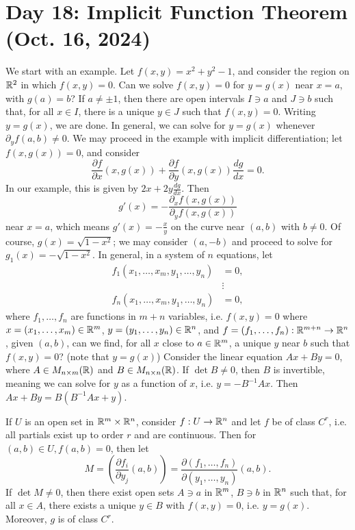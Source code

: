 \section{Day 18: Implicit Function Theorem (Oct. 16, 2024)}
We start with an example. Let $f(x, y) = x^2 + y^2 - 1$, and consider the region on $\mathbb R^2$ in which $f(x, y) = 0$. Can we solve $f(x, y) = 0$ for $y = g(x)$ near $x = a$, with $g(a) = b$? If $a \neq \pm 1$, then there are open intervals $I \ni a$ and $J \ni b$ such that, for all $x \in I$, there is a unique $y \in J$ such that $f(x, y) = 0$. Writing $y = g(x)$, we are done.
\medskip\newline
In general, we can solve for $y = g(x)$ whenever $\partial_y f (a, b) \neq 0$. We may proceed in the example with implicit differentiation; let $f(x, g(x)) = 0$, and consider
\[ \frac{\partial f}{\partial x} (x, g(x)) + \frac{\partial f}{\partial y}(x, g(x)) \frac{dg}{dx} = 0. \]
In our example, this is given by $2x + 2y \frac{dg}{dx}$. Then
\[ g'(x) = -\frac{\partial_x f(x, g(x))}{\partial_y f(x, g(x))} \]
near $x = a$, which means $g'(x) = -\frac{x}{y}$ on the curve near $(a, b)$ with $b \neq 0$. Of course, $g(x) = \sqrt{1 - x^2}$; we may consider $(a, -b)$ and proceed to solve for $g_1(x) = -\sqrt{1 - x^2}$.
\medskip\newline
In general, in a system of $n$ equations, let
\begin{align*}
    f_1(x_1, \dots, x_m, y_1, \dots, y_n) &= 0, \\
    &\vdots \\
    f_n(x_1, \dots, x_m, y_1, \dots, y_n) &= 0,
\end{align*}
where $f_1, \dots, f_n$ are functions in $m + n$ variables, i.e. $f(x, y) = 0$ where $x = (x_1, \dots, x_m) \in \mathbb R^m$, $y = (y_1, \dots, y_n) \in \mathbb R^n$, and $f = (f_1, \dots, f_n) : \mathbb R^{m+n} \to \mathbb R^n$, given $(a, b)$, can we find, for all $x$ close to $a \in \mathbb R^m$, a unique $y$ near $b$ such that $f(x, y) = 0$? (note that $y = g(x)$)
\medskip\newline
Consider the linear equation $Ax + By = 0$, where $A \in M_{n \times m}(\mathbb R)$ and $B \in M_{n \times n}(\mathbb R)$. If $\det B \neq 0$, then $B$ is invertible, meaning we can solve for $y$ as a function of $x$, i.e. $y = -B^{-1}Ax$. Then $Ax + By = B(B^{-1} Ax + y)$.
\begin{simplethm}
    If $U$ is an open set in $\mathbb R^m \times \mathbb R^n$, consider $f : U \to \mathbb R^n$ and let $f$ be of class $C^r$, i.e. all partials exist up to order $r$ and are continuous. Then for $(a, b) \in U, f(a, b) = 0$, then let
    \[ M = \left(\frac{\partial f_i}{\partial y_j} (a, b)\right) = \frac{\partial (f_1, \dots, f_n)}{\partial (y_1, \dots, y_n)}(a, b). \]
    If $\det M \neq 0$, then there exist open sets $A \ni a$ in $\mathbb R^m$, $B \ni b$ in $\mathbb R^n$ such that, for all $x \in A$, there exists a unique $y \in B$ with $f(x, y) = 0$, i.e. $y = g(x)$. Moreover, $g$ is of class $C^r$.
\end{simplethm}
